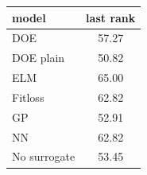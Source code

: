 \begin{tabular}{|lc|}
\hline
model & last rank\\
\hline
DOE & 57.27 \\
DOE plain & 50.82 \\
ELM & 65.00 \\
Fitloss & 62.82 \\
GP & 52.91 \\
NN & 62.82 \\
No surrogate & 53.45 \\
\hline
\end{tabular}
